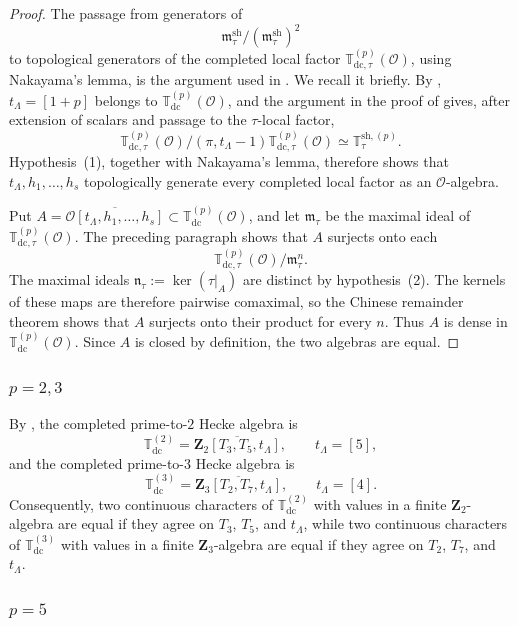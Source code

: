 \documentclass[11pt]{article}
\theoremstyle{plain}
\theoremstyle{definition}
\theoremstyle{remark}
\numberwithin{equation}{section}
\begin{document}
\begin{proof}
The passage from generators of \[\mathfrak m_\tau^{\mathrm{sh}}/(\mathfrak m_\tau^{\mathrm{sh}})^2\] to topological generators of the completed local factor \(\mathbb T_{\mathrm{dc},\tau}^{(p)}(\mathcal O)\), using Nakayama's lemma, is the argument used in \cite[\S7]{Rustom2019}. We recall it briefly. By \cite[Lemma~9]{BellaicheKhare2015}, \(t_\Lambda=[1+p]\) belongs to \(\mathbb T_{\mathrm{dc}}^{(p)}(\mathcal O)\), and the argument in the proof of \cite[Proposition~16]{BellaicheKhare2015} gives, after extension of scalars and passage to the \(\tau\)-local factor, \[\mathbb T_{\mathrm{dc},\tau}^{(p)}(\mathcal O)/(\pi,t_\Lambda-1)\mathbb T_{\mathrm{dc},\tau}^{(p)}(\mathcal O)\simeq\mathbb T_\tau^{\mathrm{sh},(p)}.\] Hypothesis~(1), together with Nakayama's lemma, therefore shows that \(t_\Lambda,h_1,\ldots,h_s\) topologically generate every completed local factor as an \(\mathcal O\)-algebra.

Put \(A=\overline{\mathcal O[t_\Lambda,h_1,\ldots,h_s]}\subset \mathbb T_{\mathrm{dc}}^{(p)}(\mathcal O)\), and let \(\mathfrak m_\tau\) be the maximal ideal of \(\mathbb T_{\mathrm{dc},\tau}^{(p)}(\mathcal O)\). The preceding paragraph shows that \(A\) surjects onto each \[ \mathbb T_{\mathrm{dc},\tau}^{(p)}(\mathcal O)/ \mathfrak m_\tau^n. \] The maximal ideals \(\mathfrak n_\tau:=\ker(\tau|_A)\) are distinct by hypothesis~(2). The kernels of these maps are therefore pairwise comaximal, so the Chinese remainder theorem shows that \(A\) surjects onto their product for every \(n\). Thus \(A\) is dense in \(\mathbb T_{\mathrm{dc}}^{(p)}(\mathcal O)\). Since \(A\) is closed by definition, the two algebras are equal. 
\end{proof}

\subsubsection{\texorpdfstring{$p = 2,3$}{p=2,3}}\label{sec:big-hecke-p2p3}

By \cite[Theorem~7.2(i)--(ii) and Proposition~3.8(i)]{Rustom2019}, the completed prime-to-\(2\) Hecke algebra is \begin{equation}\mathbb T_{\mathrm{dc}}^{(2)}=\overline{\mathbf Z_2[T_3,T_5,t_\Lambda]},\qquad t_\Lambda=[5], \label{eq:p2-big-generation} \end{equation} and the completed prime-to-\(3\) Hecke algebra is \begin{equation} \mathbb T_{\mathrm{dc}}^{(3)} = \overline{\mathbf Z_3[T_2,T_7,t_\Lambda]}, \qquad t_\Lambda=[4]. \label{eq:p3-big-generation} \end{equation} Consequently, two continuous characters of \(\mathbb T_{\mathrm{dc}}^{(2)}\) with values in a finite \(\mathbf Z_2\)-algebra are equal if they agree on \(T_3\), \(T_5\), and \(t_\Lambda\), while two continuous characters of \(\mathbb T_{\mathrm{dc}}^{(3)}\) with values in a finite \(\mathbf Z_3\)-algebra are equal if they agree on \(T_2\), \(T_7\), and \(t_\Lambda\). \subsubsection{\texorpdfstring{$p = 5$}{p=5}}
\label{sec:p5-big-hecke}
\end{document}
